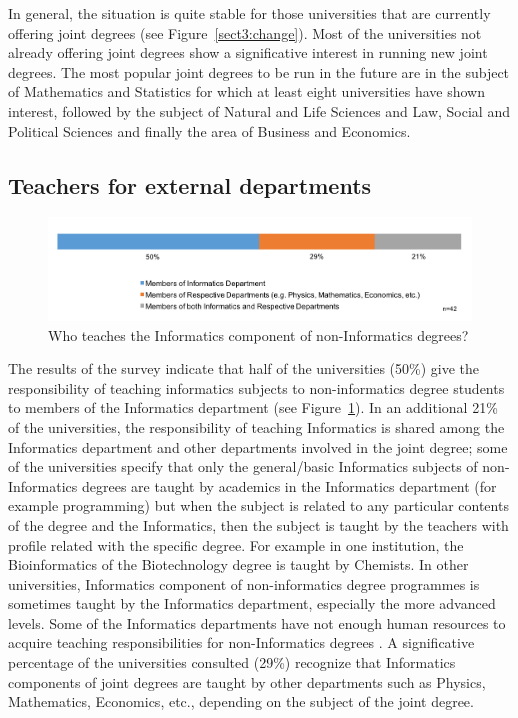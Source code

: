 In general, the situation is  quite stable for those universities that are currently offering joint degrees (see Figure~\ref{sect3:change}). Most of the universities not already offering joint degrees show a significative interest in running new joint degrees. The most popular joint degrees to be run in the future are in the subject of Mathematics and Statistics for which at least eight universities have shown interest, followed by the subject of 
Natural and Life Sciences  and 
Law, Social and Political Sciences and finally the area of  Business and Economics. 

\subsection{Teachers for external departments}
\begin{figure}[h]
\includegraphics[width = \linewidth]{charts/2c.png}
\caption{Who teaches the Informatics component of non-Informatics degrees?}
\label{sect3:teachers}
\end{figure}

The results of the survey indicate that half of the universities (50\%) give the responsibility of teaching informatics subjects to non-informatics degree students to members of the Informatics department (see Figure~\ref{sect3:teachers}). In an additional 21\% of the universities, the responsibility of teaching Informatics is shared among the Informatics department and other departments involved in the joint degree; some of the universities specify that only the general/basic Informatics subjects of non-Informatics degrees are taught by academics in the Informatics department (for example programming) but when the subject is related to any particular contents of the degree and the Informatics, then the subject is taught by the teachers with profile related with the specific degree. For example in one institution, the Bioinformatics of the Biotechnology degree is taught by Chemists. In other universities, Informatics component of non-informatics degree programmes is sometimes taught by the Informatics department, especially the more advanced levels. Some of the Informatics departments have not enough human resources to acquire teaching responsibilities  for non-Informatics degrees . A significative percentage of the universities consulted (29\%) recognize that Informatics components of joint degrees are taught by other departments such as Physics, Mathematics, Economics, etc., depending on the subject of the joint degree.

